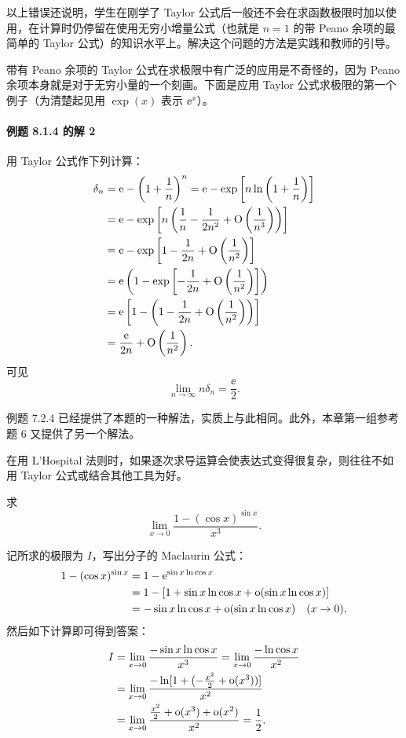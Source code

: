 以上错误还说明，学生在刚学了 Taylor 公式后一般还不会在求函数极限时加以使用，在计算时仍停留在使用无穷小增量公式（也就是 $n=1$ 的带 Peano 余项的最简单的 Taylor 公式）的知识水平上。解决这个问题的方法是实践和教师的引导。

带有 Peano 余项的 Taylor 公式在求极限中有广泛的应用是不奇怪的，因为 Peano 余项本身就是对于无穷小量的一个刻画。下面是应用 Taylor 公式求极限的第一个例子（为清楚起见用 $\exp(x)$ 表示 $\ee^x$）。

\paragraph{例题 8.1.4 的解 2}
用 Taylor 公式作下列计算：
\begin{align*}
  \delta_n
  &=\mathrm{e}-\left(1+\frac1n\right)^n
   =\mathrm{e}-\exp\left[n\ln\left(1+\frac1n\right)\right]\\
  &=\mathrm{e}-\exp\left[n\left(\frac1n-\frac1{2n^2}+\mathrm{O}\left(\frac1{n^3}\right)\right)\right]\\
  &=\mathrm{e}-\exp\left[1-\frac1{2n}+\mathrm{O}\left(\frac1{n^2}\right)\right]\\
  &=\mathrm{e}\left(1-\exp\left[-\frac1{2n}+\mathrm{O}\left(\frac1{n^2}\right)\right]\right)\\
  &=\mathrm{e}\left[1-\left(1-\frac1{2n}+\mathrm{O}\left(\frac1{n^2}\right)\right)\right]\\
  &=\frac{\mathrm{e}}{2n}+\mathrm{O}\left(\frac1{n^2}\right).
\end{align*}
可见
\[
  \lim_{n\to\infty}n\delta_n=\frac{\ee}{2}.
\]
\begin{xremark}
例题 7.2.4 已经提供了本题的一种解法，实质上与此相同。此外，本章第一组参考题 6 又提供了另一个解法。
\end{xremark}

在用 L'Hospital 法则时，如果逐次求导运算会使表达式变得很复杂，则往往不如用 Taylor 公式或结合其他工具为好。

\begin{xexample}[8.1.7]
求
\[
  \lim_{x\to0}\frac{1-(\cos x)^{\sin x}}{x^3}.
\]
\end{xexample}
\begin{xsolution}
记所求的极限为 $I$，写出分子的 Maclaurin 公式：
\begin{align*}
  1-(\cos x)^{\sin x}
  &=1-\mathrm{e}^{\sin x\ln\cos x}\\
  &=1-[1+\sin x\ln\cos x+\mathrm{o}(\sin x\ln\cos x)]\\
  &=-\sin x\ln\cos x+\mathrm{o}(\sin x\ln\cos x)\quad(x\to0),
\end{align*}
然后如下计算即可得到答案：
\begin{align*}
  I
  &=\lim_{x\to0}\frac{-\sin x\ln\cos x}{x^3}
   =\lim_{x\to0}\frac{-\ln\cos x}{x^2}\\
  &=\lim_{x\to0}\frac{-\ln[1+(-\frac{x^2}{2}+\mathrm{o}(x^3))]}{x^2}\\
  &=\lim_{x\to0}\frac{\frac{x^2}{2}+\mathrm{o}(x^3)+\mathrm{o}(x^2)}{x^2}
   =\frac12.
\end{align*}
\end{xsolution}

